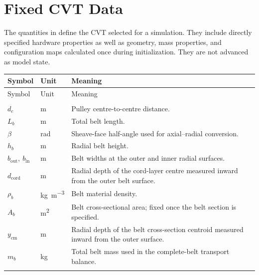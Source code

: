 \documentclass[11pt]{report}
\numberwithin{equation}{section}
\begin{document}
\vspace{-1cm}
\section*{Fixed CVT Data}

The quantities in  define the CVT selected for a
simulation. They include directly specified hardware properties as well as
geometry, mass properties, and configuration maps calculated once during
initialization. They are not advanced as model state.

\begin{center}
\small
\setlength{\LTleft}{0pt}
\setlength{\LTright}{0pt}
\begin{longtable}{@{}p{}p{}p{}@{}}
\toprule
Symbol & Unit & Meaning \\ \midrule
\endfirsthead
\toprule
Symbol & Unit & Meaning \\ \midrule
\endhead
\bottomrule
\endfoot
\endlastfoot

\multicolumn{3}{@{}l}{\textbf{Belt and common geometry}} \\
$d_c$ & \si{\meter} & Pulley centre-to-centre distance. \\
$L_b$ & \si{\meter} & Total belt length. \\
$\beta$ & \si{\radian} & Sheave-face half-angle used for axial--radial conversion. \\
$h_b$ & \si{\meter} & Radial belt height. \\
$b_{\mathrm{out}},\ b_{\mathrm{in}}$ & \si{\meter} & Belt widths at the outer and inner radial surfaces. \\
$d_{\mathrm{cord}}$ & \si{\meter} & Radial depth of the cord-layer centre measured inward from the outer belt surface. \\
$\rho_b$ & \si{\kilogram\per\meter\cubed} & Belt material density. \\
$A_b$ & \si{\meter\squared} & Belt cross-sectional area; fixed once the belt section is specified. \\
$y_{\mathrm{cm}}$ & \si{\meter} & Radial depth of the belt cross-section centroid measured inward from the outer surface. \\
$m_b$ & \si{\kilogram} & Total belt mass used in the complete-belt transport balance. \\
\addlinespace


\end{longtable}
\end{center}
\end{document}
